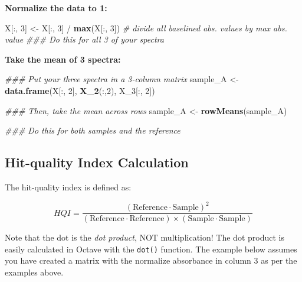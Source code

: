 \documentclass[]{tufte-book}
\newenvironment{Shaded}{}{}
\newcommand{\CommentTok}[1]{\textcolor[rgb]{0.38,0.63,0.69}{\textit{#1}}}
\newcommand{\DecValTok}[1]{\textcolor[rgb]{0.25,0.63,0.44}{#1}}
\newcommand{\KeywordTok}[1]{\textcolor[rgb]{0.00,0.44,0.13}{\textbf{#1}}}
\newcommand{\NormalTok}[1]{#1}
\newcommand{\OperatorTok}[1]{\textcolor[rgb]{0.40,0.40,0.40}{#1}}
\newcommand{\StringTok}[1]{\textcolor[rgb]{0.25,0.44,0.63}{#1}}
\begin{document}
\textbf{Normalize the data to 1:}

\begin{Shaded}
\begin{Highlighting}[]
\NormalTok{X[}\OperatorTok{:}\NormalTok{, }\DecValTok{3}\NormalTok{] <-}\StringTok{ }\NormalTok{X[}\OperatorTok{:}\NormalTok{, }\DecValTok{3}\NormalTok{] }\OperatorTok{/}\StringTok{ }\KeywordTok{max}\NormalTok{(X[}\OperatorTok{:}\NormalTok{, }\DecValTok{3}\NormalTok{])  }\CommentTok{# divide all baselined abs. values by max abs. value}
\CommentTok{### Do this for all 3 of your spectra}
\end{Highlighting}
\end{Shaded}

\textbf{Take the mean of 3 spectra:}

\begin{Shaded}
\begin{Highlighting}[]
\CommentTok{### Put your three spectra in a 3-column matrix}
\NormalTok{sample_A <-}\StringTok{ }\KeywordTok{data.frame}\NormalTok{(X[}\OperatorTok{:}\NormalTok{, }\DecValTok{2}\NormalTok{], }\KeywordTok{X_2}\NormalTok{(}\OperatorTok{:}\NormalTok{,}\DecValTok{2}\NormalTok{), X_}\DecValTok{3}\NormalTok{[}\OperatorTok{:}\NormalTok{, }\DecValTok{2}\NormalTok{])}

\CommentTok{### Then, take the mean across rows}
\NormalTok{sample_A <-}\StringTok{ }\KeywordTok{rowMeans}\NormalTok{(sample_A) }

\CommentTok{### Do this for both samples and the reference}
\end{Highlighting}
\end{Shaded}

\hypertarget{hit-quality-index-calculation}{%
\subsection*{Hit-quality Index Calculation}\label{hit-quality-index-calculation}}

The hit-quality index is defined as:

\[
HQI = \frac{(\text{Reference} \cdot \text{Sample})^2}{(\text{Reference} \cdot \text{Reference}) \times (\text{Sample} \cdot \text{Sample})}
\]

Note that the dot is the \emph{dot product}, NOT multiplication! The dot product is easily calculated in Octave with the \texttt{dot()} function. The example below assumes you have created a matrix with the normalize absorbance in column 3 as per the examples above.
\end{document}
